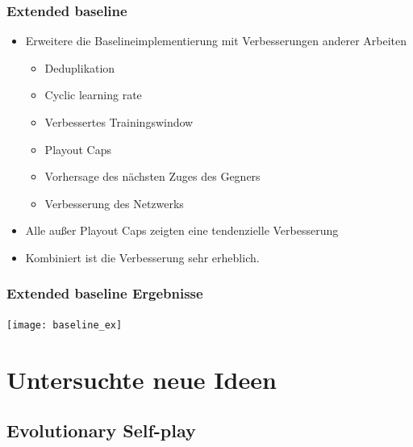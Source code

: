 \begin{frame}
 \frametitle{Extended baseline}
  


\begin{itemize}
  \item \pause Erweitere die Baselineimplementierung mit Verbesserungen anderer Arbeiten
\begin{itemize}
  \item \pause Deduplikation
  \item \pause Cyclic learning rate
  \item \pause Verbessertes Trainingswindow
  \item \pause Playout Caps
  \item \pause Vorhersage des nächsten Zuges des Gegners
  \item \pause Verbesserung des Netzwerks
\end{itemize}
\end{itemize}

\begin{itemize}
  \item \pause Alle außer Playout Caps zeigten eine tendenzielle Verbesserung
  \item \pause Kombiniert ist die Verbesserung sehr erheblich.
\end{itemize}

  
\end{frame}
\begin{frame}
 \frametitle{Extended baseline Ergebnisse}
  


\center \texttt{[image: baseline\_ex]}

  
\end{frame}

\section{Untersuchte neue Ideen}




\subsection{Evolutionary Self-play}



